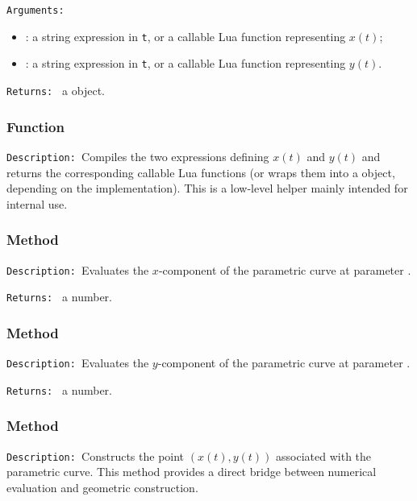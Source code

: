 \texttt{Arguments: }\par
\begin{itemize}
\item {}: a string expression in \texttt{t}, or a callable Lua
      function representing $x(t)$;
\item {}: a string expression in \texttt{t}, or a callable Lua
      function representing $y(t)$.
\end{itemize}

\texttt{Returns: } a  object.

\subsubsection{Function }
\label{ssub:method_pfct_compile}

\texttt{Description: }Compiles the two expressions defining $x(t)$ and $y(t)$
and returns the corresponding callable Lua functions (or wraps them into a
 object, depending on the implementation). This is a low-level
helper mainly intended for internal use.


\subsubsection{Method }
\label{ssub:method_pfct_x}

\texttt{Description: }Evaluates the $x$-component of the parametric curve at
parameter .

\medskip
\texttt{Returns: } a number.

\subsubsection{Method }
\label{ssub:method_pfct_y}

\texttt{Description: }Evaluates the $y$-component of the parametric curve at
parameter .

\medskip
\texttt{Returns: } a number.

\subsubsection{Method }
\label{ssub:method_pfct_point}


\texttt{Description: }Constructs the point $(x(t),y(t))$ associated with the
parametric curve. This method provides a direct bridge between numerical
evaluation and geometric construction.

